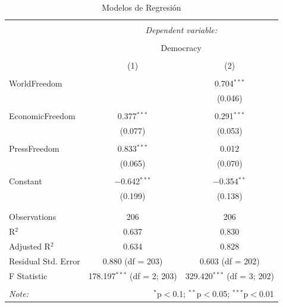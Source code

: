 \documentclass{article}
\begin{document}
\begin{table}[!htbp] \centering 
  \caption{Modelos de Regresión} 
  \label{} 
\begin{tabular}{@{\extracolsep{5pt}}lcc} 
\\[-1.8ex]\hline 
\hline \\[-1.8ex] 
 & \multicolumn{2}{c}{\textit{Dependent variable:}} \\ 
\cline{2-3} 
\\[-1.8ex] & \multicolumn{2}{c}{Democracy} \\ 
\\[-1.8ex] & (1) & (2)\\ 
\hline \\[-1.8ex] 
 WorldFreedom &  & 0.704$^{***}$ \\ 
  &  & (0.046) \\ 
  & & \\ 
 EconomicFreedom & 0.377$^{***}$ & 0.291$^{***}$ \\ 
  & (0.077) & (0.053) \\ 
  & & \\ 
 PressFreedom & 0.833$^{***}$ & 0.012 \\ 
  & (0.065) & (0.070) \\ 
  & & \\ 
 Constant & $-$0.642$^{***}$ & $-$0.354$^{**}$ \\ 
  & (0.199) & (0.138) \\ 
  & & \\ 
\hline \\[-1.8ex] 
Observations & 206 & 206 \\ 
R$^{2}$ & 0.637 & 0.830 \\ 
Adjusted R$^{2}$ & 0.634 & 0.828 \\ 
Residual Std. Error & 0.880 (df = 203) & 0.603 (df = 202) \\ 
F Statistic & 178.197$^{***}$ (df = 2; 203) & 329.420$^{***}$ (df = 3; 202) \\ 
\hline 
\hline \\[-1.8ex] 
\textit{Note:}  & \multicolumn{2}{r}{$^{*}$p$<$0.1; $^{**}$p$<$0.05; $^{***}$p$<$0.01} \\ 
\end{tabular} 
\end{table} 
\end{document}
